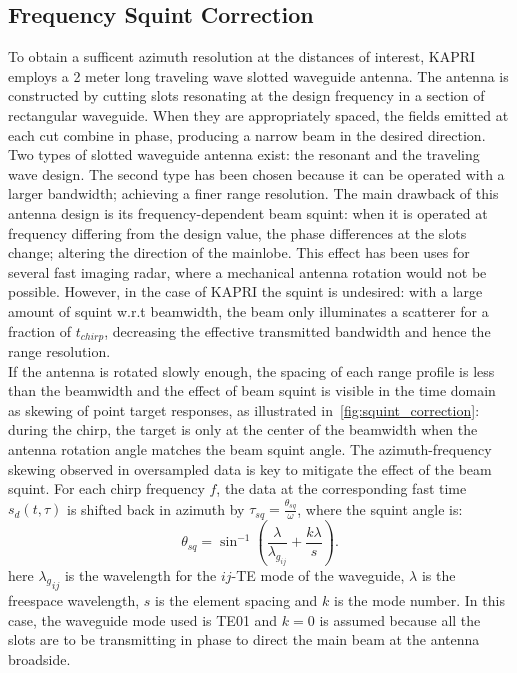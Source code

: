 \subsection{Frequency Squint Correction}\label{sec:methods:squint_correction}
To obtain a sufficent azimuth resolution at the distances of interest, KAPRI employs a 2 meter long traveling wave slotted waveguide antenna\cite{Hines1953a,Granet2007}. The antenna is constructed by cutting slots resonating at the design frequency in a section of rectangular waveguide. When they are appropriately spaced, the fields emitted at each cut combine in phase, producing a narrow beam in the desired direction. Two types of slotted waveguide antenna exist\cite{Enjiu2013}: the resonant and the traveling wave design. The second type has been chosen because it can be operated with a larger bandwidth; achieving a finer range resolution. The main drawback of this antenna design is its frequency-dependent beam squint: when it is operated at frequency differing from the design value, the phase differences at the slots change; altering the direction of the mainlobe. This effect has been uses for several fast imaging radar, where a mechanical antenna rotation would not be possible\cite{Yang2014,Yang2012,Mayer2003,Alvarez2013}. However, in the case of KAPRI the squint is undesired: with a large amount of squint w.r.t beamwidth, the beam only illuminates a scatterer for a fraction of $t_{chirp}$, decreasing the effective transmitted bandwidth and hence the range resolution. \\ 
If the antenna is rotated slowly enough,  the spacing of each range profile is less than the beamwidth and the effect of beam squint is visible in the time domain as skewing of point target responses, as illustrated in~\autoref{fig:squint_correction}: during the chirp, the target is only at the center of the beamwidth when the antenna rotation angle matches the beam squint angle. 
The azimuth-frequency skewing observed in oversampled data is key to mitigate the effect of the beam squint. For each chirp frequency $f$, the data at the corresponding fast time $s_{d}\left(t,\tau\right)$ is shifted back in azimuth by $\tau_{sq}=\frac{\theta_{sq}}{\omega}$, where the squint angle is:
\begin{equation}\label{eq:squint_exact}
	\theta_{sq} = \sin^{-1}\left(\frac{\lambda}{\lambda_{g_{ij}}} + \frac{k \lambda}{s}\right).
\end{equation}
here ${\lambda_g}_{ij}$ is the wavelength for the $ij$-TE mode of the waveguide, $\lambda$ is the freespace wavelength, $s$ is the element spacing and $k$ is the mode number. In this case, the waveguide mode used is TE01 and $k=0$ is assumed because all the slots are to be transmitting in phase\cite{kraus88} to direct the main beam at the antenna broadside.\\

